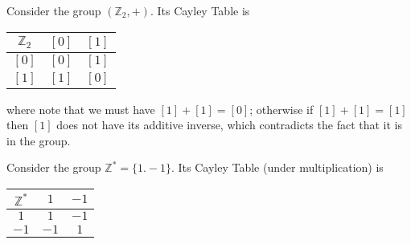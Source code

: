 \documentclass[notoc,notitlepage]{tufte-book}
\begin{document}
\begin{eg}
  Consider the group $(\mathbb{Z}_2, +)$. Its Cayley Table is
  \begin{center}
    \begin{tabular}{c|c|c}
      $\mathbb{Z}_2$ & $[0]$ & $[1]$ \\
      \hline
      $[0]$     & $[0]$ & $[1]$ \\
      $[1]$     & $[1]$ & $[0]$ 
    \end{tabular}
  \end{center}
  where note that we must have $[1] + [1] = [0]$; otherwise if $[1] + [1] = [1]$ then $[1]$ does not have its additive inverse, which contradicts the fact that it is in the group.
\end{eg}


\begin{eg}
  Consider the group $\mathbb{Z}^* = \{1. -1\}$. Its Cayley Table (under multiplication) is
  \begin{center}
    \begin{tabular}{c|c|c}
      $\mathbb{Z}^*$ & $1$    & $-1$ \\
      \hline
      $1$              & $1$  & $-1$ \\
      $-1$             & $-1$ & $1$
    \end{tabular}
  \end{center}
\end{eg}
\end{document}

